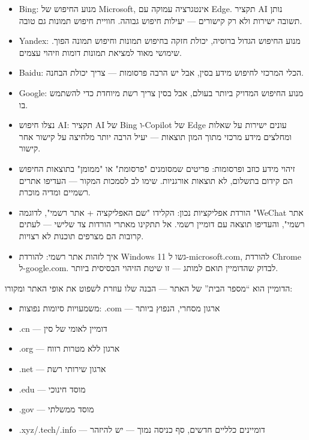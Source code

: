 
\begin{itemize}
  \item Bing: מנוע החיפוש של Microsoft, אינטגרציה עמוקה עם Edge. תקציר AI נותן תשובה ישירות ולא רק קישורים — יעילות חיפוש גבוהה. חוויית חיפוש תמונות גם טובה.
  \item Yandex: מנוע החיפוש הגדול ברוסיה, יכולת חזקה בחיפוש תמונות וחיפוש תמונה הפוך. שימושי מאוד למציאת תמונות דומות וזיהוי עצמים.
  \item Baidu: הכלי המרכזי לחיפוש מידע בסין, אבל יש הרבה פרסומות — צריך יכולת הבחנה.
  \item Google: מנוע החיפוש המדויק ביותר בעולם, אבל בסין צריך רשת מיוחדת כדי להשתמש בו.
\end{itemize}


\begin{itemize}
  \item נצלו חיפוש AI: תקציר AI של Bing ו-Copilot של Edge עונים ישירות על שאלות ומחלצים מידע מרכזי מתוך המון תוצאות — יעיל הרבה יותר מלחיצה על קישור אחר קישור.
  \item זיהוי מידע כוזב ופרסומות: פריטים שמסומנים "פרסומת" או "ממומן" בתוצאות החיפוש הם קידום בתשלום, לא תוצאות אורגניות. שימו לב לסמכות המקור — העדיפו אתרים רשמיים ומדיה מוכרת.
  \item הורדת אפליקציות נכון: הקלידו "שם האפליקציה + אתר רשמי", לדוגמה "WeChat אתר רשמי", והעדיפו תוצאה עם דומיין רשמי. אל תתקינו מאתרי הורדות צד שלישי — לעתים קרובות הם מצרפים תוכנות לא רצויות.
  \item איך לזהות אתר רשמי: להורדת Windows 11 גשו ל-microsoft.com, להורדת Chrome ל-google.com. לבדוק שהדומיין תואם למותג — זו שיטת הזיהוי הבסיסית ביותר.
\end{itemize}


הדומיין הוא “מספר הבית” של האתר — הבנה שלו עוזרת לשפוט את אופי האתר ומקורו:

\begin{itemize}
  \item משמעויות סיומות נפוצות: .com — ארגון מסחרי, הנפוץ ביותר
  \item .cn — דומיין לאומי של סין
  \item .org — ארגון ללא מטרות רווח
  \item .net — ארגון שירותי רשת
  \item .edu — מוסד חינוכי
  \item .gov — מוסד ממשלתי
  \item .xyz/.tech/.info — דומיינים כלליים חדשים, סף כניסה נמוך — יש להיזהר
\end{itemize}


